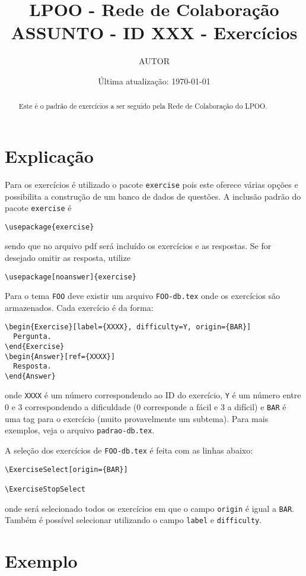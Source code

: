 \documentclass[a4paper,12pt]{article}
\title{ LPOO - Rede de Colaboração \\
ASSUNTO - ID XXX - Exercícios }
\author{ AUTOR }
\date{ Última atualização: \today }
\begin{document}
\maketitle

\begin{abstract}
Este é o padrão de exercícios a ser seguido pela Rede de Colaboração do LPOO.
\end{abstract}

\section{Explicação}
Para os exercícios é utilizado o pacote \lstinline+exercise+ pois este oferece várias
opções e possibilita a construção de um banco de dados de questões. A inclusão
padrão do pacote \lstinline+exercise+ é
\begin{lstlisting}
\usepackage{exercise}
\end{lstlisting}
sendo que no arquivo pdf será incluído os exercícios e as respostas. Se for
desejado omitir as resposta, utilize
\begin{lstlisting}
\usepackage[noanswer]{exercise}
\end{lstlisting}

Para o tema \lstinline+FOO+ deve existir um arquivo \lstinline+FOO-db.tex+ onde os
exercícios são armazenados. Cada exercício é da forma:
\begin{lstlisting}
\begin{Exercise}[label={XXXX}, difficulty=Y, origin={BAR}]
  Pergunta.
\end{Exercise}
\begin{Answer}[ref={XXXX}]
  Resposta.
\end{Answer}
\end{lstlisting}
onde \lstinline+XXXX+ é um número correspondendo ao ID do exercício, \lstinline+Y+ é um
número entre 0 e 3 correspondendo a dificuldade (0 corresponde a fácil e 3 a
difícil) e \lstinline+BAR+ é uma tag para o exercício (muito provavelmente um
subtema). Para mais exemplos, veja o arquivo \lstinline+padrao-db.tex+.

A seleção dos exercícios de \lstinline+FOO-db.tex+ é feita com as linhas abaixo:
\begin{lstlisting}
\ExerciseSelect[origin={BAR}]

\ExerciseStopSelect
\end{lstlisting}
onde será selecionado todos os exercícios em que o campo \lstinline+origin+ é igual a
\lstinline+BAR+. Também é possível selecionar utilizando o campo \lstinline+label+ e
\lstinline+difficulty+.

\section{Exemplo}
\ExerciseSelect[label={easy,medium,hard,veryhard,question,lstlisting}]

\ExerciseStopSelect
\end{document}
